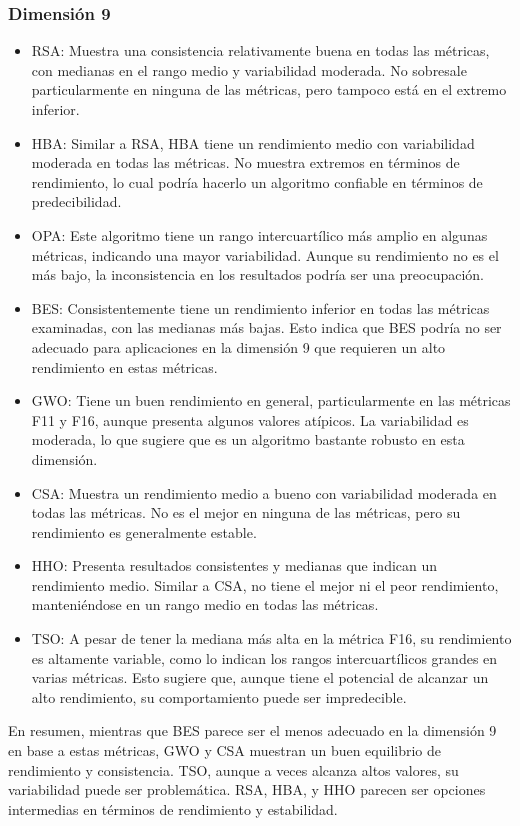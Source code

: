 \documentclass[conference]{IEEEtran}
\begin{document}
\subsubsection{Dimensión 9}
\begin{itemize}
\item RSA: Muestra una consistencia relativamente buena en todas las métricas, con medianas en el rango medio y variabilidad moderada. No sobresale particularmente en ninguna de las métricas, pero tampoco está en el extremo inferior.

\item HBA: Similar a RSA, HBA tiene un rendimiento medio con variabilidad moderada en todas las métricas. No muestra extremos en términos de rendimiento, lo cual podría hacerlo un algoritmo confiable en términos de predecibilidad.

\item OPA: Este algoritmo tiene un rango intercuartílico más amplio en algunas métricas, indicando una mayor variabilidad. Aunque su rendimiento no es el más bajo, la inconsistencia en los resultados podría ser una preocupación.

\item BES: Consistentemente tiene un rendimiento inferior en todas las métricas examinadas, con las medianas más bajas. Esto indica que BES podría no ser adecuado para aplicaciones en la dimensión 9 que requieren un alto rendimiento en estas métricas.

\item GWO: Tiene un buen rendimiento en general, particularmente en las métricas F11 y F16, aunque presenta algunos valores atípicos. La variabilidad es moderada, lo que sugiere que es un algoritmo bastante robusto en esta dimensión.

\item CSA: Muestra un rendimiento medio a bueno con variabilidad moderada en todas las métricas. No es el mejor en ninguna de las métricas, pero su rendimiento es generalmente estable.

\item HHO: Presenta resultados consistentes y medianas que indican un rendimiento medio. Similar a CSA, no tiene el mejor ni el peor rendimiento, manteniéndose en un rango medio en todas las métricas.

\item TSO: A pesar de tener la mediana más alta en la métrica F16, su rendimiento es altamente variable, como lo indican los rangos intercuartílicos grandes en varias métricas. Esto sugiere que, aunque tiene el potencial de alcanzar un alto rendimiento, su comportamiento puede ser impredecible.

\end{itemize}
\noindent En resumen, mientras que BES parece ser el menos adecuado en la dimensión 9 en base a estas métricas, GWO y CSA muestran un buen equilibrio de rendimiento y consistencia. TSO, aunque a veces alcanza altos valores, su variabilidad puede ser problemática. RSA, HBA, y HHO parecen ser opciones intermedias en términos de rendimiento y estabilidad.
\end{document}
